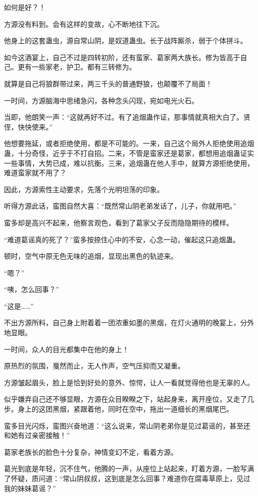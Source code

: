 \begin{this_body}
如何是好？！

方源没有料到。会有这样的变故，心不断地往下沉。

他身上的这套蛊虫，源自常山阴，是奴道蛊虫。长于战阵厮杀，弱于个体拼斗。

如今这酒宴上，自己不过是四转初阶，还有蛮家、葛家两大族长。修为皆高于自己。更有一些家老，护卫。都有三转修为。

就算是自己将狼群带过来，两三千头的普通野狼，也颠覆不了局面！

一时间，方源脑海中思绪急闪，各种念头闪现，宛如电光火石。

当即，他朗笑一声：“这就再好不过。有了追烟蛊作证，那事情就真相大白了。贤侄，快快使来。”

他想要拖延，或者拒绝使用，都是不可能的。一来，自己这个局外人拒绝使用追烟蛊，十分奇怪，近乎于不打自招。二来，不管是蛮家还是葛家，都想用追烟蛊证实一些事情，大势已成，难以抗衡。三来，追烟蛊在他人手中，就算方源拒绝使用，难道蛮家就不用了？

因此，方源索性主动要求，先落个光明坦荡的印象。

听得方源此话，蛮图自然大喜：“既然常山阴老弟发话了，儿子，你就用吧。”

蛮多却是高兴不起来，他察言观色，看到了葛家父子反而隐隐期待的模样。

“难道葛谣真的死了？”蛮多按捺住心中的不安，心念一动，催起这只追烟蛊。

顿时，空气中原无色无味的追烟，显现出黑色的轨迹来。

“嗯？”

“咦，怎么回事？”

“这是……”

不出方源所料，自己身上附着着一团浓重如墨的黑烟，在灯火通明的晚宴上，分外地显眼。

一时间，众人的目光都集中在他的身上！

原热烈的氛围，戛然而止，无人作声，空气压抑而又凝重。

方源皱起眉头，脸上是恰到好处的意外、惊愕，让人一看就觉得他也是无辜的人。

似乎嫌弃自己还不够显眼，方源在众目睽睽之下，站起身来，离开座位，又走了几步。身上的这团黑烟，紧跟着他，同时在空中，拖出一道细长的黑烟尾巴。

蛮多目光闪烁，蛮图兴奋地道：“这么说来，常山阴老弟你是见过葛谣的，甚至还和她有过亲密接触！”

葛家老族长的脸色十分复杂，神情变幻不定，看着方源。

葛光到底是年轻，沉不住气，他腾的一声，从座位上站起来，盯着方源，一脸写满了怀疑，质问道：“常山阴叔叔，这到底是怎么回事？难道你在腐毒草原上，见过我的妹妹葛谣？”


\end{this_body}
